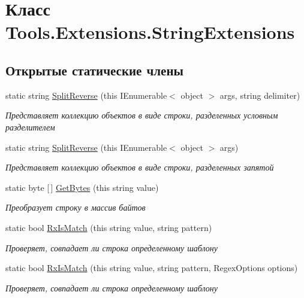 \hypertarget{class_tools_1_1_extensions_1_1_string_extensions}{}\section{Класс Tools.\+Extensions.\+String\+Extensions}
\label{class_tools_1_1_extensions_1_1_string_extensions}
\subsection*{Открытые статические члены}
\begin{DoxyCompactItemize}
\item 
static string \hyperlink{class_tools_1_1_extensions_1_1_string_extensions_ab166b8b8c99911d1076107c1ad9c0e38}{Split\+Reverse} (this I\+Enumerable$<$ object $>$ args, string delimiter)
\begin{DoxyCompactList}\small\item\em Представляет коллекцию объектов в виде строки, разделенных условным разделителем \end{DoxyCompactList}\item 
static string \hyperlink{class_tools_1_1_extensions_1_1_string_extensions_a8cb5209b6cddfb87605c26392c07bf03}{Split\+Reverse} (this I\+Enumerable$<$ object $>$ args)
\begin{DoxyCompactList}\small\item\em Представляет коллекцию объектов в виде строки, разделенных запятой \end{DoxyCompactList}\item 
static byte \mbox{[}$\,$\mbox{]} \hyperlink{class_tools_1_1_extensions_1_1_string_extensions_a35b4eac65d15ef9bfe072075c22d076d}{Get\+Bytes} (this string value)
\begin{DoxyCompactList}\small\item\em Преобразует строку в массив байтов \end{DoxyCompactList}\item 
static bool \hyperlink{class_tools_1_1_extensions_1_1_string_extensions_a5cfeaf9864fd321d1742a69561bd5c87}{Rx\+Is\+Match} (this string value, string pattern)
\begin{DoxyCompactList}\small\item\em Проверяет, совпадает ли строка определенному шаблону \end{DoxyCompactList}\item 
static bool \hyperlink{class_tools_1_1_extensions_1_1_string_extensions_a3281a4c7afd7b8eb10951b5d815b9421}{Rx\+Is\+Match} (this string value, string pattern, Regex\+Options options)
\begin{DoxyCompactList}\small\item\em Проверяет, совпадает ли строка определенному шаблону \end{DoxyCompactList}\end{DoxyCompactItemize}


